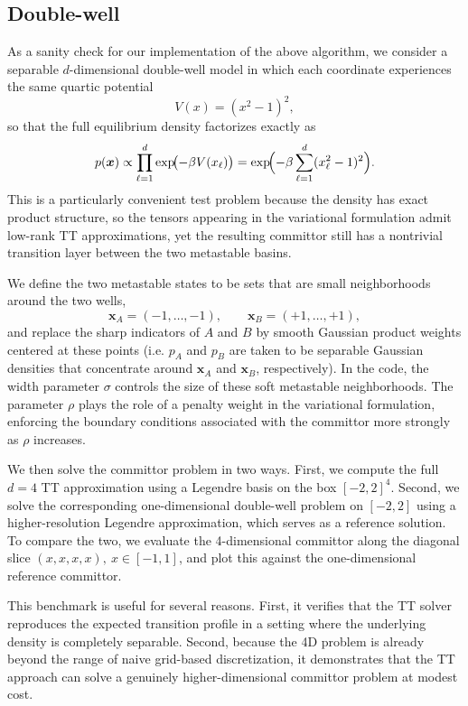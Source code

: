 \documentclass[11pt]{amsart}
\begin{document}
\subsection{Double-well}
As a sanity check for our implementation of the above algorithm, we consider a separable $d$-dimensional double-well model in which each coordinate experiences the same quartic potential
\begin{equation}
    V(x) = (x^2-1)^2,
\end{equation}
so that the full equilibrium density factorizes exactly as
\begin{equation}
    p(\boldsymbol{x}) \propto \prod_{\ell=1}^d \exp\!\bigl(-\beta V(x_\ell)\bigr)
    = \exp\!\Bigl(-\beta \sum_{\ell=1}^d (x_\ell^2-1)^2\Bigr).
\end{equation}
This is a particularly convenient test problem because the density has exact product structure, so the tensors appearing in the variational formulation admit low-rank TT approximations, yet the resulting committor still has a nontrivial transition layer between the two metastable basins.

We define the two metastable states to be sets that are small neighborhoods around the two wells,
\begin{equation}
    \boldsymbol{x}_A = (-1,\dots,-1), \qquad \boldsymbol{x}_B = (+1,\dots,+1),
\end{equation}
and replace the sharp indicators of $A$ and $B$ by smooth Gaussian product weights centered at these points (i.e. $p_A$ and $p_B$ are taken to be separable Gaussian densities that concentrate around $\boldsymbol{x}_A$ and $\boldsymbol{x}_B$, respectively). In the code, the width parameter $\sigma$ controls the size of these soft metastable neighborhoods. The parameter $\rho$ plays the role of a penalty weight in the variational formulation, enforcing the boundary conditions associated with the committor more strongly as $\rho$ increases.

We then solve the committor problem in two ways. First, we compute the full $d=4$ TT approximation using a Legendre basis on the box $[-2,2]^4$. Second, we solve the corresponding one-dimensional double-well problem on $[-2,2]$ using a higher-resolution Legendre approximation, which serves as a reference solution. To compare the two, we evaluate the 4-dimensional committor along the diagonal slice $(x,x,x,x), \ x \in [-1,1]$,
and plot this against the one-dimensional reference committor.

This benchmark is useful for several reasons. First, it verifies that the TT solver reproduces the expected transition profile in a setting where the underlying density is completely separable. Second, because the 4D problem is already beyond the range of naive grid-based discretization, it demonstrates that the TT approach can solve a genuinely higher-dimensional committor problem at modest cost. 
\end{document}
